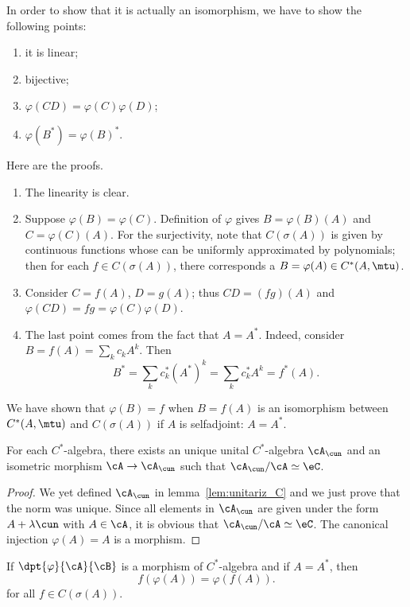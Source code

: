 In order to show that it is actually an isomorphism, we have to show the following points:
 \begin{enumerate}
     \item
          it is linear;
      \item
         bijective;
     \item
         $\varphi(CD)=\varphi(C)\varphi(D)$;
     \item
         $\varphi(B^*)=\varphi(B)^*$.
 \end{enumerate}
 Here are the proofs.
 \begin{enumerate}
     \item
        The linearity is clear.
    \item
        Suppose $\varphi(B)=\varphi(C)$. Definition of $\varphi$ gives $B=\varphi(B)(A)$ and $C=\varphi(C)(A)$. For the surjectivity, note that $C(\sigma(A))$ is given by continuous functions whose can be uniformly approximated by polynomials; then for each $f\in C( \sigma(A))$, there corresponds a $B=\varphi(A)\in C^*(A,\mtu)$.
    \item
        Consider $C=f(A)$, $D=g(A)$; thus $CD=(fg)(A)$ and $\varphi(CD)=fg=\varphi(C)\varphi(D)$.
    \item
        The last point comes from the fact that $A=A^*$. Indeed, consider $B=f(A)=\sum_k c_kA^k$. Then
        \[
            B^*=\sum_k c_k^*(A^*)^k=\sum_k c_k^*A^k=f^*(A).
        \]
 \end{enumerate}

We have shown that $\varphi(B)=f$ when $B=f(A)$ is an isomorphism between $C^*(A,\mtu)$ and $C(\sigma(A))$ if $A$ is selfadjoint: $A=A^*$.

\begin{corollary}
For each $C^*$-algebra, there exists an unique unital $C^*$-algebra $\cA_{\cun}$ and an isometric morphism $\cA\to\cA_{\cun}$ such that $\cA_{\cun}/\cA\simeq\eC$.
\end{corollary}\label{cor_csa_unit}

\begin{proof}
We yet defined $\cA_{\cun}$ in lemma~\ref{lem:unitariz_C} and we just prove that the norm was unique. Since all elements in $\cA_{\cun}$ are given under the form $A+\lambda\cun$ with $A\in\cA$, it is obvious that $\cA_{\cun}/\cA\simeq\eC$. The canonical injection $\varphi(A)=A$ is a morphism.
\end{proof}


\begin{lemma}
If $\dpt{\varphi}{\cA}{\cB}$ is a morphism of $C^*$-algebra and if $A=A^*$, then
\[
  f(\varphi(A))=\varphi(f(A)).
\]
for all $f\in C(\sigma(A))$.
\end{lemma} \label{lem:fvpvpf}


